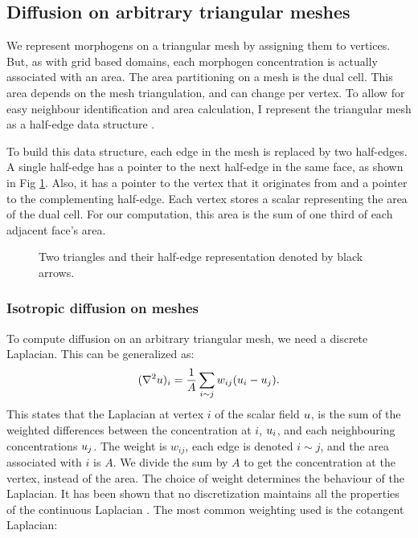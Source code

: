 \begin{figure}[H]
\centering
{}
\end{figure}

\subsection{Diffusion on arbitrary triangular meshes}
We represent morphogens on a triangular mesh by assigning them to vertices. But, as with grid based domains, each morphogen concentration is actually associated with an area. The area partitioning on a mesh is the dual cell. This area depends on the mesh triangulation, and can change per vertex. To allow for easy neighbour identification and area calculation, I represent the triangular mesh as a half-edge data structure \cite{Mantyla1988}. 

To build this data structure, each edge in the mesh is replaced by two half-edges. A single half-edge has a pointer to the next half-edge in the same face, as shown in Fig \ref{fig:halfEdgeMesh}. Also, it has a pointer to the vertex that it originates from and a pointer to the complementing half-edge. Each vertex stores a scalar representing the area of the dual cell. For our computation, this area is the sum of one third of each adjacent face's area. %

\begin{figure}[H]
	\centering
	\caption{Two triangles and their half-edge representation denoted by black arrows.}
	\label{fig:halfEdgeMesh}
\end{figure}

\subsubsection*{Isotropic diffusion on meshes}
To compute diffusion on an arbitrary triangular mesh, we need a discrete Laplacian. This can be generalized as:
\[
(\nabla^2{} u)_i = \frac{1}{A} \sum_{i \sim j} w_{ij}(u_i - u_j).
\]
This states that the Laplacian at vertex $i$ of the scalar field $u$, is the sum of the weighted differences between the concentration at $i$, $u_i$, and each neighbouring concentrations $u_j$. The weight is $w_{ij}$, each edge is denoted $i \sim j$, and the area associated with $i$ is $A$. We divide the sum by $A$ to get the concentration at the vertex, instead of the area. The choice of weight determines the behaviour of the Laplacian. It has been shown that no discretization maintains all the properties of the continuous Laplacian \cite{Wardetzky2007}. The most common weighting used is the cotangent Laplacian:

